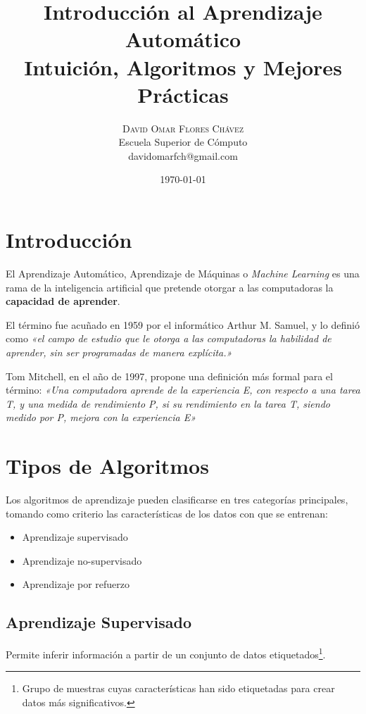 \documentclass[twoside,twocolumn]{article}
\title{Introducción al Aprendizaje Automático
    \large \\[2\baselineskip]
    Intuición, Algoritmos y Mejores Prácticas
    \\[2\baselineskip]
  } %
\author{
      \textsc{David Omar Flores Chávez} \\[1ex] %
      \normalsize Escuela Superior de Cómputo \\ %
      \normalsize {davidomarfch@gmail.com}\\[2\baselineskip] %
  }
\date{\today} %
\begin{document}
  
  \maketitle
  
  \section{Introducción}
  
    El Aprendizaje Automático, 
    Aprendizaje de Máquinas o \textit{Machine Learning} es una rama
    de la inteligencia artificial que pretende otorgar a las computadoras
    la \textbf{capacidad de aprender}.

    El término fue acuñado en 1959 por el informático Arthur M. Samuel, y lo
    definió como \textit{«el campo de estudio que le otorga a las computadoras
    la habilidad de aprender, sin ser programadas de manera explícita.»} \cite{Samuel:1959:SML:1661923.1661924}

    Tom Mitchell, en el año de 1997, propone una definición más formal para el
    término: \textit{«Una computadora aprende de la experiencia E, con respecto a
    una tarea T, y una medida de rendimiento P, si su rendimiento en la tarea T,
    siendo medido por P, mejora con la experiencia E»} \cite{Mitchell1997}

  
  \section{Tipos de Algoritmos}
  
      Los algoritmos de aprendizaje pueden clasificarse en tres
      categorías principales, tomando como criterio las 
      características de los datos con que se entrenan:

      \begin{itemize}
        \item Aprendizaje supervisado
        \item Aprendizaje no-supervisado
        \item Aprendizaje por refuerzo
      \end{itemize}

      \subsection{Aprendizaje Supervisado}
        Permite inferir información a partir de un conjunto de
        datos etiquetados\footnote{Grupo de muestras cuyas características
        han sido etiquetadas para crear datos más significativos.}.
\end{document}
